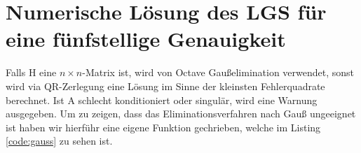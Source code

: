 \chapter{Numerische Lösung des LGS für eine fünfstellige Genauigkeit}
Falls H eine \(n \times n\)-Matrix ist, wird von Octave Gaußelimination verwendet, sonst wird via
QR-Zerlegung eine Lösung im Sinne der kleinsten Fehlerquadrate berechnet. Ist A schlecht
konditioniert oder singulär, wird eine Warnung ausgegeben. Um zu zeigen, dass das
Eliminationsverfahren nach Gauß ungeeignet ist haben wir hierführ eine eigene Funktion gechrieben,
welche im Listing \ref{code:gauss} zu sehen ist.

\lstset{label=code:gauss, caption=Gauß-Eliminationsverfahren als Matlab-/Octavescript}
